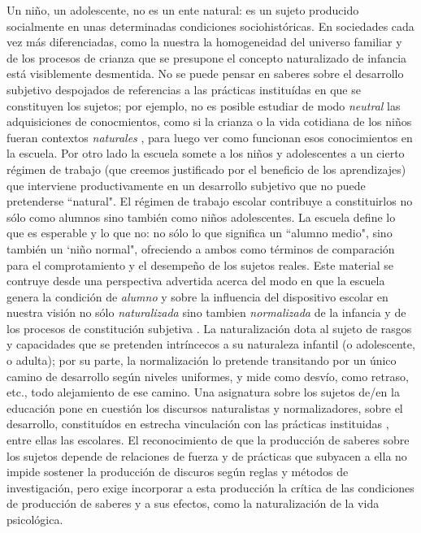 \documentclass[a4paper,12pt,spanish]{book}
\begin{document}
 Un niño, un adolescente, no es un ente natural: es un sujeto producido socialmente en unas determinadas condiciones sociohistóricas. En 
 sociedades cada vez más diferenciadas, como la nuestra la homogeneidad del universo familiar y de los procesos de crianza que se presupone 
 el concepto naturalizado de infancia está visiblemente desmentida. No se puede pensar en saberes sobre el desarrollo subjetivo despojados 
 de referencias a las prácticas instituídas en que se constituyen los sujetos; por ejemplo, no es posible estudiar de modo \textit{neutral} 
 las adquisiciones de conocmientos, como si la crianza o la vida cotidiana de los niños fueran contextos \textit{naturales} \citep{castorina2007}, 
 para luego ver como funcionan esos conocimientos en la escuela.
 Por otro lado la escuela somete a los niños y adolescentes a un cierto régimen de trabajo (que creemos justificado por el beneficio de los 
 aprendizajes) que interviene productivamente en un desarrollo subjetivo que no puede pretenderse ``natural". El régimen de trabajo escolar 
 contribuye a constituirlos no sólo como alumnos sino también como niños adolescentes. La 
 escuela define lo que es esperable y lo que no: no sólo lo que significa un ``alumno medio", sino 
 también un `niño normal", ofreciendo a ambos como términos de comparación para el 
 comprotamiento y el desempeño de los sujetos reales.
 Este material se contruye desde una perspectiva advertida acerca del modo en que la escuela 
 genera la condición de \textit{alumno} y sobre la influencia del dispositivo escolar en nuestra visión no 
 sólo \textit{naturalizada} sino tambien \textit{normalizada} de la infancia y de los procesos de constitución 
 subjetiva \citep{baqueroyterigi1996}. La naturalización dota al sujeto de rasgos y capacidades que 
 se pretenden intríncecos a su naturaleza infantil (o adolescente, o adulta); por su parte, la 
 normalización lo pretende transitando por un único camino de desarrollo según niveles 
 uniformes, y mide como desvío, como retraso, etc., todo alejamiento de ese camino. Una 
 asignatura sobre los sujetos de/en la educación pone en cuestión los discursos naturalistas y 
 normalizadores, sobre el desarrollo, constituídos en estrecha vinculación con las prácticas 
 instituidas \citep{walkerdine1995}, entre ellas las escolares. El reconocimiento de que la 
 producción de saberes sobre los sujetos depende de relaciones de fuerza y de prácticas que subyacen a ella 
 no impide sostener la producción de discuros según reglas y métodos de investigación, pero 
 exige incorporar a esta producción la crítica de las condiciones de producción de saberes y a sus efectos,
 como la naturalización de la vida psicológica.

 

\end{document}
